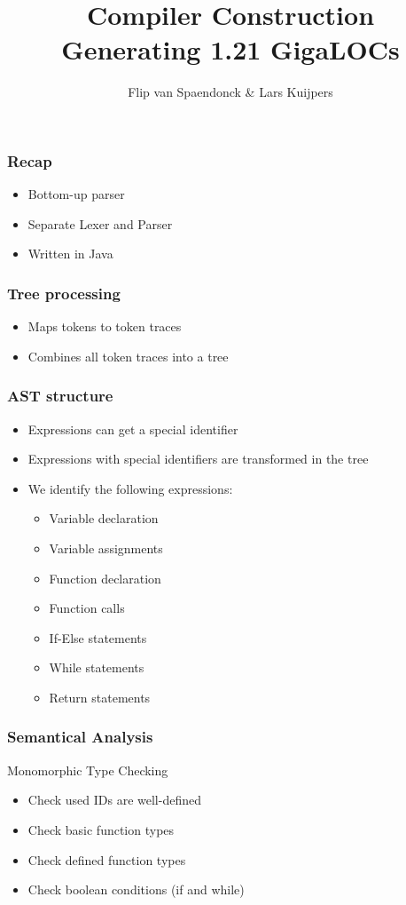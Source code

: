 \documentclass{beamer}
\author[Flip \& Lars]{Flip van Spaendonck \& Lars Kuijpers}
\title{Compiler Construction \\ Generating 1.21 GigaLOCs}
\begin{document}
\begin{frame}
\titlepage
\end{frame}

\begin{frame}
\frametitle{Recap}
\begin{itemize}
\item Bottom-up parser
\item Separate Lexer and Parser
\item Written in Java
\end{itemize}
\end{frame}

\begin{frame}
\frametitle{Tree processing}
\begin{itemize}
\item Maps tokens to token traces
\item Combines all token traces into a tree
\end{itemize}
\end{frame}

\begin{frame}
\frametitle{AST structure}
\begin{itemize}
\item Expressions can get a special identifier
\item Expressions with special identifiers are transformed in the tree
\item We identify the following expressions:
\begin{itemize}
\item Variable declaration
\item Variable assignments
\item Function declaration
\item Function calls
\item If-Else statements
\item While statements
\item Return statements
\end{itemize}
\end{itemize}
\end{frame}

\begin{frame}
\frametitle{Semantical Analysis}
Monomorphic Type Checking
\begin{itemize}
\item Check used IDs are well-defined
\item Check basic function types
\item Check defined function types
\item Check boolean conditions (if and while)
\end{itemize}
\end{frame}
\end{document}
